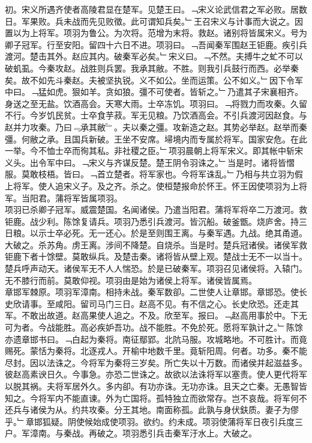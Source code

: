 \documentclass{zhvt-classic}
\begin{document}
\hspace*{2em}初。宋义所遇齐使者高陵君显在楚军。见楚王曰。﹁宋义论武信君之军必败。居数日。军果败。兵未战而先见败徵。此可谓知兵矣。﹂王召宋义与计事而大说之。因置以为上将军。项羽为鲁公。为次将。范增为末将。救赵。诸别将皆属宋义。号为卿子冠军。行至安阳。留四十六日不进。项羽曰。﹁吾闻秦军围赵王钜鹿。疾引兵渡河。楚击其外。赵应其内。破秦军必矣。﹂宋义曰。﹁不然。夫搏牛之虻不可以破虮虱。今秦攻赵。战胜则兵罢。我承其敝。不胜。则我引兵鼓行而西。必举秦矣。故不如先斗秦赵。夫被坚执锐。义不如公。坐而运策。公不如义。﹂因下令军中曰。﹁猛如虎。狠如羊。贪如狼。彊不可使者。皆斩之。﹂乃遣其子宋襄相齐。身送之至无盐。饮酒高会。天寒大雨。士卒冻饥。项羽曰。﹁将戮力而攻秦。久留不行。今岁饥民贫。士卒食芋菽。军无见粮。乃饮酒高会。不引兵渡河因赵食。与赵并力攻秦。乃曰﹃承其敝﹄。夫以秦之彊。攻新造之赵。其势必举赵。赵举而秦彊。何敝之承。且国兵新破。王坐不安席。埽境内而专属於将军。国家安危。在此一举。今不恤士卒而徇其私。非社稷之臣。﹂项羽晨朝上将军宋义。即其帐中斩宋义头。出令军中曰。﹁宋义与齐谋反楚。楚王阴令羽诛之。﹂当是时。诸将皆慴服。莫敢枝梧。皆曰。﹁首立楚者。将军家也。今将军诛乱。﹂乃相与共立羽为假上将军。使人追宋义子。及之齐。杀之。使桓楚报命於怀王。怀王因使项羽为上将军。当阳君。蒲将军皆属项羽。\\
\hspace*{2em}项羽已杀卿子冠军。威震楚国。名闻诸侯。乃遣当阳君。蒲将军将卒二万渡河。救钜鹿。战少利。陈馀复请兵。项羽乃悉引兵渡河。皆沉船。破釜甑。烧庐舍。持三日粮。以示士卒必死。无一还心。於是至则围王离。与秦军遇。九战。绝其甬道。大破之。杀苏角。虏王离。涉间不降楚。自烧杀。当是时。楚兵冠诸侯。诸侯军救钜鹿下者十馀壁。莫敢纵兵。及楚击秦。诸将皆从壁上观。楚战士无不一以当十。楚兵呼声动天。诸侯军无不人人惴恐。於是已破秦军。项羽召见诸侯将。入辕门。无不膝行而前。莫敢仰视。项羽由是始为诸侯上将军。诸侯皆属焉。\\
\hspace*{2em}章邯军棘原。项羽军漳南。相持未战。秦军数卻。二世使人让章邯。章邯恐。使长史欣请事。至咸阳。留司马门三日。赵高不见。有不信之心。长史欣恐。还走其军。不敢出故道。赵高果使人追之。不及。欣至军。报曰。﹁赵高用事於中。下无可为者。今战能胜。高必疾妒吾功。战不能胜。不免於死。愿将军孰计之。﹂陈馀亦遗章邯书曰。﹁白起为秦将。南征鄢郢。北阬马服。攻城略地。不可胜计。而竟赐死。蒙恬为秦将。北逐戎人。开榆中地数千里。竟斩阳周。何者。功多。秦不能尽封。因以法诛之。今将军为秦将三岁矣。所亡失以十万数。而诸侯并起滋益多。彼赵高素谀日久。今事急。亦恐二世诛之。故欲以法诛将军以塞责。使人更代将军以脱其祸。夫将军居外久。多内卻。有功亦诛。无功亦诛。且天之亡秦。无愚智皆知之。今将军内不能直谏。外为亡国将。孤特独立而欲常存。岂不哀哉。将军何不还兵与诸侯为从。约共攻秦。分王其地。南面称孤。此孰与身伏鈇质。妻子为僇乎。﹂章邯狐疑。阴使候始成使项羽。欲约。约未成。项羽使蒲将军日夜引兵度三户。军漳南。与秦战。再破之。项羽悉引兵击秦军汙水上。大破之。\\
\end{document}
